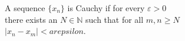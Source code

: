 \documentclass[preview]{standalone}
\begin{document}
\begin{center}
A sequence $\{x_n\}$ is Cauchy if for every $\varepsilon > 0$\\there exists an $N\in \mathbb{N}$ such that for all $m, n \geq N$\\$\left| x_n - x_m \right| <arepsilon$.
\end{center}
\end{document}
